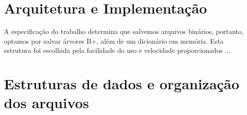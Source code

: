\documentclass[ecp,tc]{iiufrgs}
\begin{document}
\chapter{Arquitetura e Implementação}
A especificação do trabalho determina que salvemos arquivos binários, portanto, optamos por salvar árvores B+, além de um dicionário em memória. Esta estrutura foi escolhida pela facilidade do uso e velocidade proporcionados $\dots$ 

\chapter{Estruturas de dados e organização dos arquivos}
\end{document}
